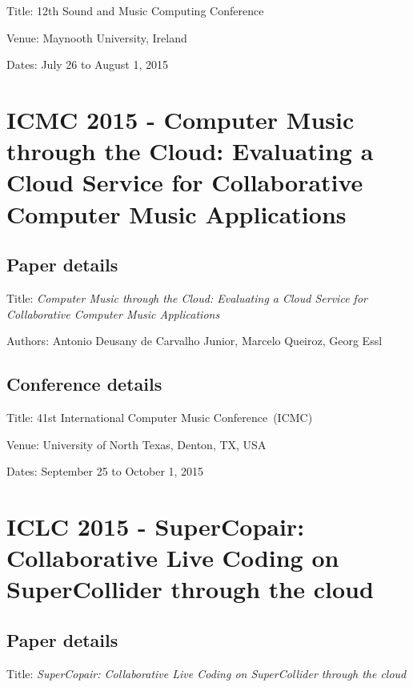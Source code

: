 Title: 12th Sound and Music Computing Conference

Venue: Maynooth University, Ireland

Dates: July 26 to August 1, 2015



\section{ICMC 2015 - Computer Music through the Cloud: Evaluating a Cloud Service for Collaborative Computer Music Applications}
\label{ape:papericmc2015}

\subsection*{Paper details}

Title: \textit{Computer Music through the Cloud: Evaluating a Cloud Service for Collaborative Computer Music Applications}

Authors: Antonio Deusany de Carvalho Junior, Marcelo Queiroz, Georg Essl

\subsection*{Conference details}

Title: 41st International Computer Music Conference~(ICMC)

Venue: University of North Texas, Denton, TX, USA

Dates: September 25 to October 1, 2015



\section{ICLC 2015 - SuperCopair: Collaborative Live Coding on SuperCollider through the cloud}
\label{ape:papericlc2015}

\subsection*{Paper details}

Title: \textit{SuperCopair: Collaborative Live Coding on SuperCollider through the cloud}

